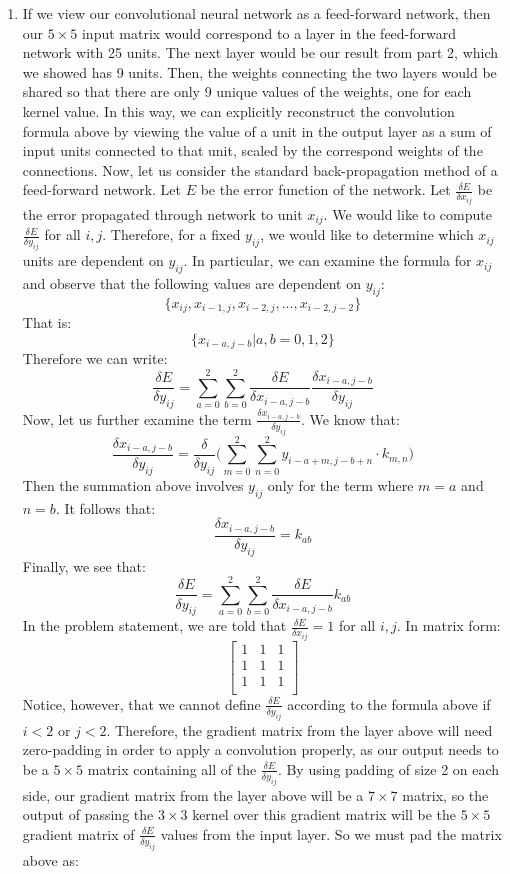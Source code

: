 \documentclass[a4paper]{article}
\begin{document}
\begin{enumerate}
{ }
\item{If we view our convolutional neural network as a feed-forward network, then our $5 \times 5$ input matrix would correspond to a layer in the feed-forward network with 25 units. The next layer would be our result from part 2, which we showed has 9 units. Then, the weights connecting the two layers would be shared so that there are only 9 unique values of the weights, one for each kernel value. In this way, we can explicitly reconstruct the convolution formula above by viewing the value of a unit in the output layer as a sum of input units connected to that unit, scaled by the correspond weights of the connections. 
\newline
\newline
Now, let us consider the standard back-propagation method of a feed-forward network. Let $E$ be the error function of the network. Let $\frac{\delta E}{\delta x_{ij}}$ be the error propagated through network to unit $x_{ij}$. We would like to compute $\frac{\delta E}{\delta y_{ij}}$ for all $i, j$. Therefore, for a fixed $y_{ij}$, we would like to determine which $x_{ij}$ units are dependent on $y_{ij}$. In particular, we can examine the formula for $x_{ij}$ and observe that the following values are dependent on $y_{ij}$:
$$\{ x_{ij}, x_{i-1,j}, x_{i-2,j}, ..., x_{i-2,j-2} \} $$
That is:
$$\{ x_{i - a, j-b} | a, b = 0, 1, 2 \} $$
Therefore we can write:
$$ \frac{\delta E}{\delta y_{ij}} = \sum_{a=0}^2 \sum_{b=0}^2 \frac{\delta E}{\delta x_{i-a,j-b}} \frac{\delta x_{i-a,j-b}}{\delta y_{ij}}$$
Now, let us further examine the term $\frac{\delta x_{i-a,j-b}}{\delta y_{ij}}$. We know that:
$$ \frac{\delta x_{i-a,j-b}}{\delta y_{ij}} = \frac{\delta}{\delta y_{ij}} \Bigg( \sum_{m=0}^2 \sum_{n=0}^2 y_{i-a+m,j-b+n} \cdot k_{m,n} \Bigg) $$ 
Then the summation above involves $y_{ij}$ only for the term where $m=a$ and $n=b$. It follows that:
$$ \frac{\delta x_{i-a,j-b}}{\delta y_{ij}} = k_{ab}$$ 
Finally, we see that:
$$ \frac{\delta E}{\delta y_{ij}} = \sum_{a=0}^2 \sum_{b=0}^2 \frac{\delta E}{\delta x_{i-a,j-b}} k_{ab}$$
In the problem statement, we are told that $\frac{\delta E }{ \delta x_{ij}} = 1$ for all $i, j$. In matrix form:
$$ \begin{bmatrix}
1 & 1 & 1 \\
1 & 1 & 1 \\
1 & 1 & 1 \\
\end{bmatrix}
$$
\newline
\newline
Notice, however, that we cannot define $\frac{\delta E}{\delta y_{ij}}$ according to the formula above if $i < 2$ or $j < 2$. Therefore, the gradient matrix from the layer above will need zero-padding in order to apply a convolution properly, as our output needs to be a $5 \times 5$ matrix containing all of the $\frac{ \delta E}{\delta y_{ij}}$. By using padding of size 2 on each side, our gradient matrix from the layer above will be a $7 \times 7$ matrix, so the output of passing the $3 \times 3$ kernel over this gradient matrix will be the $5 \times 5$ gradient matrix of $\frac{ \delta E}{\delta y_{ij}}$ values from the input layer. So we must pad the matrix above as:
}
\end{enumerate}
\end{document}
